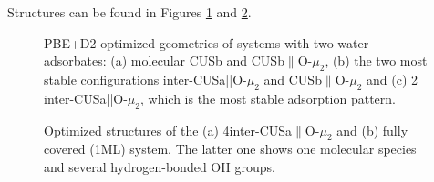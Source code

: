\documentclass[11pt,DIV=13,BCOR=5mm,a4paper,headinclude]{scrbook}
\begin{document}
Structures can be found in Figures \ref{abb:2water} and \ref{abb:4+fully}.
\begin{figure}[!ht]
 \centering
{}
 \quad\quad
  \quad
{}
 \quad
 \caption{PBE+D2 optimized geometries of systems with two water adsorbates: (a) molecular CUSb and CUSb$\parallel$O-$\mu_2$, (b) the two most stable configurations inter-CUSa||O-$\mu_2$ and CUSb$\parallel$O-$\mu_2$ and (c) 2 inter-CUSa||O-$\mu_2$, which is the most stable adsorption pattern.}
        \label{abb:2water}
 \end{figure}
 \begin{figure}[!ht]
 \centering
{}
 \quad\quad
 \caption{Optimized structures of the (a) 4inter-CUSa$\parallel$O-$\mu_2$ and (b) fully covered (1ML) system.
The latter one shows one molecular species and several hydrogen-bonded OH groups.}
        \label{abb:4+fully}
 \end{figure}
\end{document}

